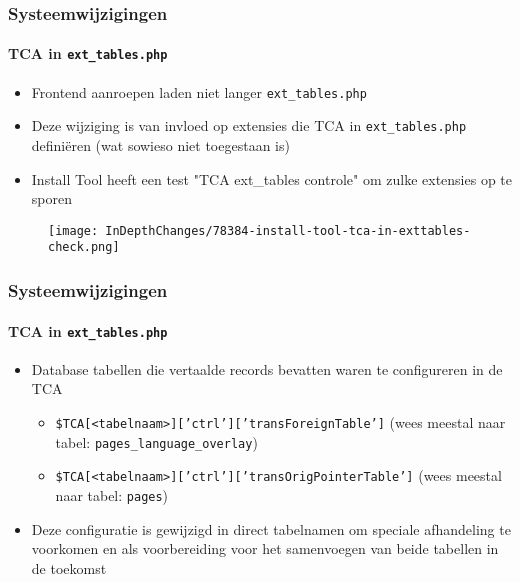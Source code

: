 \begin{frame}[fragile]
	\frametitle{Systeemwijzigingen}
	\framesubtitle{TCA in \texttt{ext\_tables.php}}

	\begin{itemize}
		\item Frontend aanroepen laden niet langer \texttt{ext\_tables.php}
		\item Deze wijziging is van invloed op extensies die TCA in  \texttt{ext\_tables.php} definiëren\newline
			\small(wat sowieso niet toegestaan is)\normalsize
		\item Install Tool heeft een test "TCA ext\_tables controle" om zulke extensies op te sporen
	\end{itemize}

	\begin{figure}
		\texttt{[image: InDepthChanges/78384-install-tool-tca-in-exttables-check.png]}
	\end{figure}

\end{frame}
\begin{frame}[fragile]
	\frametitle{Systeemwijzigingen}
	\framesubtitle{TCA in \texttt{ext\_tables.php}}

	\begin{itemize}
		\item Database tabellen die vertaalde records bevatten waren te configureren in de TCA

			\begin{itemize}
				\item \texttt{\$TCA[<tabelnaam>]['ctrl']['transForeignTable']}\newline
					(wees meestal naar tabel: \texttt{pages\_language\_overlay})
				\item \texttt{\$TCA[<tabelnaam>]['ctrl']['transOrigPointerTable']}\newline
					(wees meestal naar tabel: \texttt{pages})
			\end{itemize}

		\item Deze configuratie is gewijzigd in direct tabelnamen om speciale afhandeling te voorkomen en als voorbereiding voor
			het samenvoegen van beide tabellen in de toekomst

	\end{itemize}

\end{frame}

